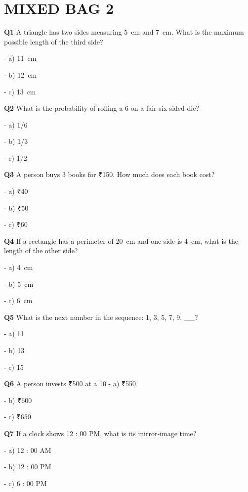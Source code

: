 \section{MIXED BAG 2}

\textbf{Q1} A triangle has two sides measuring 5 cm and 7 cm. What is the maximum possible length of the third side?\par
\quad - a) 11 cm\par
\quad - b) 12 cm\par
\quad - c) 13 cm\par

\textbf{Q2} What is the probability of rolling a 6 on a fair six‑sided die?\par
\quad - a) 1/6\par
\quad - b) 1/3\par
\quad - c) 1/2\par

\textbf{Q3} A person buys 3 books for ₹150. How much does each book cost?\par
\quad - a) ₹40\par
\quad - b) ₹50\par
\quad - c) ₹60\par

\textbf{Q4} If a rectangle has a perimeter of 20 cm and one side is 4 cm, what is the length of the other side?\par
\quad - a) 4 cm\par
\quad - b) 5 cm\par
\quad - c) 6 cm\par

\textbf{Q5} What is the next number in the sequence: 1, 3, 5, 7, 9, __?\par
\quad - a) 11\par
\quad - b) 13\par
\quad - c) 15\par

\textbf{Q6} A person invests ₹500 at a 10 %
\quad - a) ₹550\par
\quad - b) ₹600\par
\quad - c) ₹650\par

\textbf{Q7} If a clock shows 12 : 00 PM, what is its mirror‑image time?\par
\quad - a) 12 : 00 AM\par
\quad - b) 12 : 00 PM\par
\quad - c) 6 : 00 PM\par

